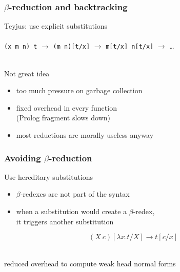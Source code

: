 \documentclass{beamer}
\begin{document}
\begin{frame}
 \frametitle{$\beta$-reduction and backtracking}


 \pause

 Teyjus: use explicit substitutions\\~\\

 \texttt{(x\ m n) t} $\rightarrow$ \texttt{(m n)[t/x]} $\rightarrow$ \texttt{m[t/x] n[t/x]} $\rightarrow$ \ldots

 \pause

 ~\\Not great idea
 \begin{itemize}
   \item too much pressure on \alert{garbage collection}
   \item fixed \alert{overhead} in every function\\
         (Prolog fragment slows down)
   \item most reductions are morally \alert{useless} anyway
 \end{itemize}
\end{frame}

\begin{frame}
 \frametitle{Avoiding $\beta$-reduction}

 Use \alert{hereditary substitutions}\\
 \begin{itemize}
   \item $\beta$-redexes are not part of the syntax
   \item when a substitution would create a $\beta$-redex,\\
         it triggers another substitution
 \end{itemize}

 $$(X~c)[\lambda x.t/X] \rightarrow t[c/x]$$

 ~\\reduced overhead to compute weak head normal forms
\end{frame}
\end{document}
